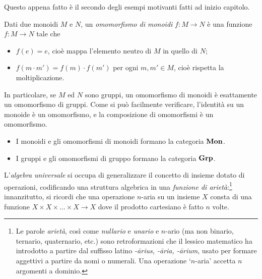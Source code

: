 Questo appena fatto è il secondo degli esempi motivanti fatti ad inizio capitolo.
\begin{example}\label{ex_cat_monoidi}
	Dati due monoidi \(M\) e \(N\), un \emph{omomorfismo di monoidi} \(f:M\to N\) è una funzione \(f:M\to N\) tale che
	\begin{itemize}
		\item \(f(e) = e\), cioè mappa l'elemento neutro di \(M\) in quello di \(N\);
		\item \(f(m\cdot m')=f(m)\cdot f(m')\) per ogni \(m,m'\in M\), cioè rispetta la moltiplicazione.
	\end{itemize}
	In particolare, se \(M\) ed \(N\) sono gruppi, un omomorfismo di monoidi è esattamente un omomorfismo di gruppi.
	Come si può facilmente verificare, l'identità su un monoide è un omomorfismo, e la composizione di omomorfismi è un omomorfismo.
	\begin{itemize}
		\item I monoidi e gli omomorfismi di monoidi formano la categoria \(\mathbf{Mon}\).
		\item I gruppi e gli omomorfismi di gruppo formano la categoria \(\mathbf{Grp}\).
	\end{itemize}
\end{example}
L'\emph{algebra universale} si occupa di generalizzare il concetto di insieme dotato di operazioni, codificando una struttura algebrica in una \emph{funzione di arietà}:\footnote{Le parole \emph{arietà}, così come \emph{nullario} e \emph{unario} e \(n\)-ario (ma non binario, ternario, quaternario, etc.) sono retroformazioni che il lessico matematico ha introdotto a partire dal suffisso latino \emph{-\={a}rius, -\=aria, -\=arium}, usato per formare aggettivi a partire da nomi o numerali. Una operazione `\(n\)-aria' accetta \(n\) argomenti a dominio.} innanzitutto, si ricordi che una operazione \(n\)-aria su un insieme \(X\) consta di una funzione \(X\times X\times\dots\times X \to X\) dove il prodotto cartesiano è fatto \(n\) volte.

